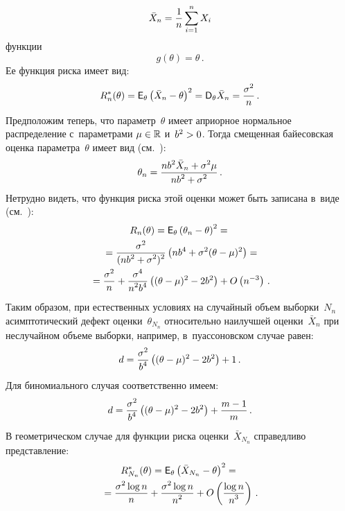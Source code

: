 \begin{multicols}{2}
\noindent
$$
\bar X_n = \displaystyle\frac{\displaystyle 1\mathstrut}{\displaystyle n\mathstrut} \sum\limits_{i=1}^n X_i
$$
функции
$$
g(\theta) = \theta\,.
$$
Ее функция риска имеет вид:
$$
R^*_{n}(\theta) = {\sf E}_\theta \left(\bar X_n - \theta\right)^2 =
 {\sf D}_\theta \bar X_n = \displaystyle\frac{\displaystyle \sigma^2\mathstrut}{\displaystyle n\mathstrut}\,.
$$
Предположим теперь, что параметр~$\theta$ имеет априорное нормальное распределение 
с~параметрами $\mu\hm \in \mathbb{R}$ и~$b^2 \hm> 0$. Тогда смещенная 
байесовская оценка параметра~$\theta$ имеет вид (см.~\cite[с.~222]{4-ben}):
$$
\theta_n = \displaystyle\frac{\displaystyle nb^2\bar X_n + \sigma^2\mu\mathstrut}{\displaystyle nb^2 + \sigma^2\mathstrut}\,.
$$
Нетрудно видеть, что функция риска этой оценки может быть записана 
в~виде (см.~\cite[формулы~(6.2) и~(6.3)]{1-ben}): 
\begin{multline*}
R_{n}(\theta) = {\sf E}_\theta \left(\theta_n - \theta\right)^2 ={}\\
{}=
\displaystyle\frac{\displaystyle \sigma^2\mathstrut}{\displaystyle (nb^2 + \sigma^2)^2\mathstrut} \left(nb^4 +\sigma^2(\theta - \mu)^2\right) =
\\
{}= \displaystyle\frac{\displaystyle \sigma^2\mathstrut}{\displaystyle n\mathstrut} + \displaystyle\frac{\displaystyle \sigma^4\mathstrut}{\displaystyle n^2b^4\mathstrut}
 \left((\theta - \mu)^2 - 2b^2\right)
+  O\left(n^{-3}\right)\,.
\end{multline*}
Таким образом, при естественных условиях на случайный объем выборки~$N_n$ 
асимптотический \mbox{дефект} оценки~$\theta_{N_n}$ относительно наилучшей оценки~$\bar X_n$ 
при неслучайном объеме выборки, например, в~пуассоновском случае равен:
$$
d = \displaystyle\frac{\displaystyle \sigma^2\mathstrut}{\displaystyle b^4\mathstrut} \left((\theta - \mu)^2 - 2b^2\right) + 1\,.
$$
Для биномиального случая соответственно имеем:
$$
d = \displaystyle\frac{\displaystyle \sigma^2\mathstrut}{\displaystyle b^4\mathstrut} \left((\theta - \mu)^2 - 2b^2\right) + \displaystyle\frac{\displaystyle m - 1\mathstrut}{\displaystyle m\mathstrut}\,.
$$
В геометрическом случае для функции риска оценки~$\bar X_{N_n}$ 
справедливо представление:
\begin{multline*}
R^*_{N_n}(\theta) = {\sf E}_\theta \left(\bar X_{N_n} - \theta\right)^2 ={}\\
{}=
\displaystyle\frac{\displaystyle \sigma^2\log n\mathstrut}{\displaystyle n\mathstrut} + \displaystyle\frac{\displaystyle \sigma^2\log n\mathstrut}{\displaystyle n^2\mathstrut} +  O\left(\displaystyle\frac{\displaystyle \log n\mathstrut}{\displaystyle n^3\mathstrut}\right)\,.
\end{multline*}


\end{multicols}
